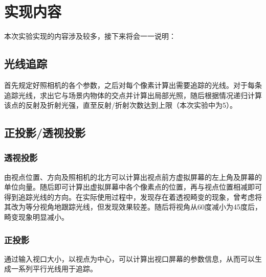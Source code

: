 \section {实现内容}
本次实验实现的内容涉及较多，接下来将会一一说明：
\subsection {光线追踪}
首先规定好照相机的各个参数，之后对每个像素计算出需要追踪的光线。对于每条追踪光线，求出它与场景内物体的交点并计算出局部光照，随后根据情况递归计算该点的反射及折射光强，直至反射/折射次数达到上限（本次实验中为5）。

\subsection {正投影/透视投影}
\subsubsection {透视投影}
由视点位置、方向及照相机的北方可以计算出视点前方虚拟屏幕的左上角及屏幕的单位向量。随后即可计算出虚拟屏幕中各个像素点的位置，再与视点位置相减即可得到追踪光线的方向。在实际使用过程中，发现存在着透视畸变的现象，曾考虑将其改为等分视角地跟踪光线，但发现效果较差。随后将视角从60度减小为45度后，畸变现象明显减小。

\subsubsection {正投影}
通过输入视口大小，以视点为中心，可以计算出视口屏幕的参数信息，从而可以生成一系列平行光线用于追踪。

